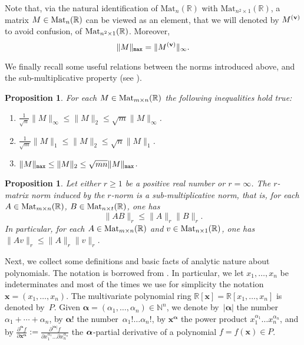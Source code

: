 \documentclass[10pt]{article}
\newcommand{\x}{{\bm x}}
\newcommand{\alfa}{{\bm \alpha}}
\newcommand\N{{\mathbb N}}
\newcommand\R{{\mathbb R}}
\newtheorem{prop}[theorem]{Proposition}
\begin{document}
Note that, via the natural identification  of $ \textrm{Mat}_n(\R)$ with $ \textrm{Mat}_{n^2 \times 1}(\R)$, 
a matrix $M\in  {\rm Mat}_n(\R)$ can be viewed as  an element, that we will denoted by $M^{({\bf v})}$ to avoid  confusion, of ${\rm Mat}_{n^2 \times 1}(\R) $. Moreover,
\begin{equation}\label{equivalent}
\| M\|_{\tt max}=\| M^{(\bf v)}\|_{ \infty}.
\end{equation}


We finally recall some useful relations between the norms introduced above, and the  sub-multiplicative property  (see \cite[\S 2.3.1]{Matrix}).

\begin{prop}\label{propMatEquivalence} 
For each $M\in {\rm Mat}_{m \times n}(\R)$ the following inequalities hold true:
\begin{enumerate}
\em\item\em \; $\frac{1}{\sqrt{n}} \|M\|_\infty \le \|M\|_2 \le \sqrt{m} \|M\|_\infty$.
\em\item\em \;  $\frac{1}{\sqrt{m}} \|M\|_1 \le \|M\|_2 \le \sqrt{n} \|M\|_1$.
\em\item\em \; $ \|M\|_{\tt max} \le \|M\|_2 \le \sqrt{mn} \|M\|_{\tt max}$.
\end{enumerate}
\end{prop}


\begin{prop}\label{subm}
Let either $r \ge 1$ be a positive real number or $r=\infty$. The $r$-matrix norm
 induced by the $r$-norm is a 
{\rm sub-multiplicative} norm, that is, for each $A \in {\rm Mat}_{m\times n}(\R)$,  $B\in {\rm Mat}_{n \times t}(\R)$, one  has 
$$
\|AB\|_r \le \|A\|_r \|B\|_r.
$$
In particular,  for each $A \in {\rm Mat}_{m\times n}(\R)$ 
and $v \in  {\rm Mat}_{n \times 1}(\R)$, one  has 
$ \|Av\|_r \le \|A\|_r \|v\|_r $.
\end{prop}

Next, we collect  some definitions 
and basic facts of analytic nature about polynomials.
The notation is borrowed from \cite{RK}.
In particular, we let $x_1,\ldots,x_n$ be indeterminates
and most of the times  we use for simplicity the notation 
$\x = (x_1,\ldots,x_n)$. 
The multivariate polynomial ring $\R[\x]=\R[x_1,\ldots,x_n]$
is denoted by~$P$.
Given $\alfa=(\alpha_1,\ldots,\alpha_n) \in \N^n$, 
we denote by~$| \alfa |$ the number $\alpha_1+\cdots+\alpha_n$, 
by $\alfa!$ the number~$\alpha_1! \ldots \alpha_n!$,  
by $\x^\alfa$ the power product $x_1^{\alpha_1} \ldots x_n^{\alpha_n}$,
and by $\frac{\partial^\alfa f}{\partial \x^\alfa} := 
\frac{\partial^{|\alfa|} f}{\partial x_1^{\alpha_1} \ldots \partial x_n^{\alpha_n}}$
the ${\bf \alfa}$-partial derivative of a polynomial $f=f(\x) \in P$. 
\end{document}
